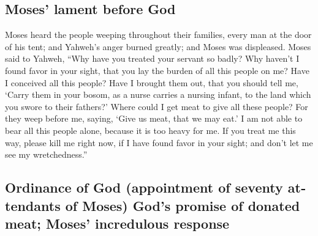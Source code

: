 \begin{paracol}{2}
\begin{otherlanguage}{english}
\hypertarget{moses-lament-before-god}{%
\subsection{Moses' lament before God}\label{moses-lament-before-god}}

 Moses heard the people weeping throughout their
families, every man at the door of his tent; and Yahweh's anger burned
greatly; and Moses was displeased.  Moses said to Yahweh,
``Why have you treated your servant so badly? Why haven't I found favor
in your sight, that you lay the burden of all this people on me?
 Have I conceived all this people? Have I brought them
out, that you should tell me, `Carry them in your bosom, as a nurse
carries a nursing infant, to the land which you swore to their fathers?'
 Where could I get meat to give all these people? For
they weep before me, saying, `Give us meat, that we may eat.'
 I am not able to bear all this people alone, because it
is too heavy for me.  If you treat me this way, please
kill me right now, if I have found favor in your sight; and don't let me
see my wretchedness.''

\hypertarget{ordinance-of-god-appointment-of-seventy-attendants-of-moses-gods-promise-of-donated-meat-moses-incredulous-response}{%
\subsection{Ordinance of God (appointment of seventy attendants of
Moses) God's promise of donated meat; Moses' incredulous
response}\label{ordinance-of-god-appointment-of-seventy-attendants-of-moses-gods-promise-of-donated-meat-moses-incredulous-response}}


\end{otherlanguage}
\end{paracol}
